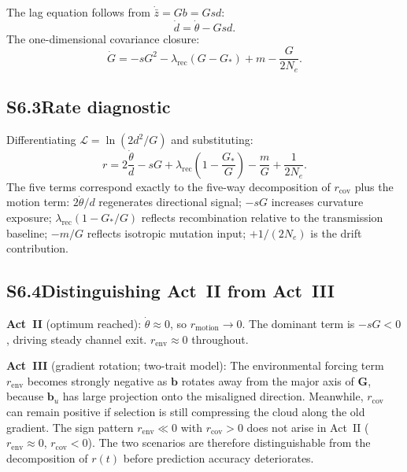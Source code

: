 \documentclass[11pt]{article}
\newcommand{\vect}[1]{\boldsymbol{#1}}
\newcommand{\mat}[1]{\mathbf{#1}}
\newcommand{\CalL}{\mathcal{L}}
\begin{document}
The lag equation follows from
$\dot{\bar{z}} = Gb = Gsd$:
\begin{equation}
\dot{d} = \dot{\theta} - Gsd.
\label{eq:S6_ddot}
\end{equation}
The one-dimensional covariance closure:
\begin{equation}
\dot{G}
= -sG^2
  - \lambda_{\mathrm{rec}}(G - G_*)
  + m
  - \frac{G}{2N_e}.
\label{eq:S6_Gdot}
\end{equation}

\subsection*{S6.3\quad Rate diagnostic}

Differentiating $\CalL = \ln(2d^2/G)$ and substituting:
\begin{equation}
r
= 2\frac{\dot{\theta}}{d}
  - sG
  + \lambda_{\mathrm{rec}}\!\left(1 - \frac{G_*}{G}\right)
  - \frac{m}{G}
  + \frac{1}{2N_e}.
\label{eq:S6_r}
\end{equation}
The five terms correspond exactly to the five-way decomposition of
$r_{\mathrm{cov}}$ plus the motion term:
$2\dot{\theta}/d$ regenerates directional signal;
$-sG$ increases curvature exposure;
$\lambda_{\mathrm{rec}}(1 - G_*/G)$ reflects recombination
relative to the transmission baseline;
$-m/G$ reflects isotropic mutation input;
$+1/(2N_e)$ is the drift contribution.

\subsection*{S6.4\quad Distinguishing Act~II from Act~III}

\textbf{Act~II} (optimum reached):
$\dot{\theta} \approx 0$, so $r_{\mathrm{motion}} \to 0$.
The dominant term is $-sG < 0$, driving steady channel exit.
$r_{\mathrm{env}} \approx 0$ throughout.

\textbf{Act~III} (gradient rotation; two-trait model):
The environmental forcing term $r_{\mathrm{env}}$ becomes strongly
negative as $\vect{b}$ rotates away from the major axis of
$\mat{G}$, because $\vect{b}_u$ has large projection onto the
misaligned direction.
Meanwhile, $r_{\mathrm{cov}}$ can remain positive if selection
is still compressing the cloud along the old gradient.
The sign pattern $r_{\mathrm{env}} \ll 0$ with $r_{\mathrm{cov}} > 0$
does not arise in Act~II ($r_{\mathrm{env}} \approx 0$,
$r_{\mathrm{cov}} < 0$).
The two scenarios are therefore distinguishable from the
decomposition of $r(t)$ before prediction accuracy deteriorates.
\end{document}
